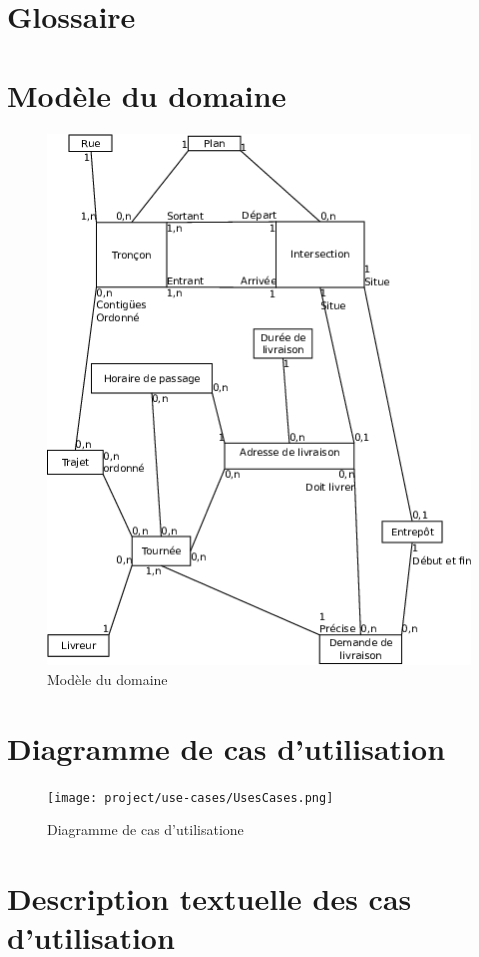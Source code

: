 \documentclass[a4paper,10pt]{article}
\begin{document}
\begin{titlepage}
  
\end{titlepage}
\tableofcontents
\pagebreak

\section{Glossaire}


\section{Modèle du domaine}

\begin{figure}[h!]
  \begin{center}
    \includegraphics[width=0.5\linewidth]{images/Modele.png}
    \caption{Modèle du domaine}
    \label{fig:modele}
  \end{center}
\end{figure}

\section{Diagramme de cas d'utilisation}

\begin{figure}[h!]
  \begin{center}
    \texttt{[image: project/use-cases/UsesCases.png]}
    \caption{Diagramme de cas d'utilisatione}
    \label{fig:useCase}
  \end{center}
\end{figure}

\section{Description textuelle des cas d’utilisation}
\end{document}
